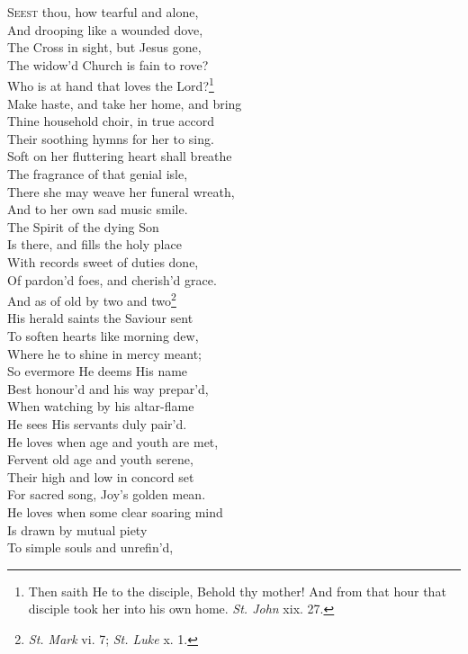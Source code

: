 \textsc{Seest} thou, how tearful and alone, \\
 And drooping like a wounded dove, \\
 The Cross in sight, but Jesus gone, \\
 The widow’d Church is fain to rove? \\
  Who is at hand that loves the Lord?\footnote{Then saith He to the disciple, Behold thy mother! And from that hour that disciple took her into his own home. \emph{St. John} xix. 27.} \\
 Make haste, and take her home, and bring \\
 Thine household choir, in true accord \\
 Their soothing hymns for her to sing. \\
  Soft on her fluttering heart shall breathe \\
 The fragrance of that genial isle, \\
 There she may weave her funeral wreath, \\
 And to her own sad music smile. \\
  The Spirit of the dying Son \\
 Is there, and fills the holy place \\
 With records sweet of duties done, \\
 Of pardon’d foes, and cherish’d grace. \\
  And as of old by two and two\footnote{\emph{St. Mark} vi. 7; \emph{St. Luke} x. 1.} \\
 His herald saints the Saviour sent \\
 To soften hearts like morning dew, \\
 Where he to shine in mercy meant; \\
  So evermore He deems His name \\
 Best honour’d and his way prepar’d, \\
 When watching by his altar-flame \\
 He sees His servants duly pair’d. \\
  He loves when age and youth are met, \\
 Fervent old age and youth serene, \\
 Their high and low in concord set \\
 For sacred song, Joy’s golden mean. \\
  He loves when some clear soaring mind \\
 Is drawn by mutual piety \\
 To simple souls and unrefin’d, \\
